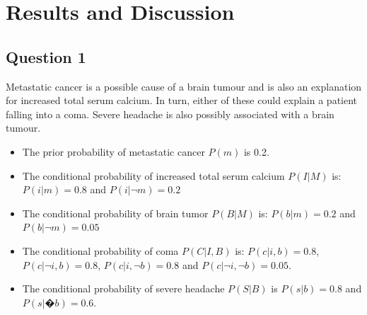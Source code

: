 \documentclass{article}
\begin{document}
\section{Results and Discussion}
\subsection{Question 1}

Metastatic cancer is a possible cause of a brain tumour and is also an explanation for increased total serum calcium. In turn, either of these could explain a patient falling into a coma. Severe headache is also possibly associated with a brain tumour. 

\begin{itemize}
\item The prior probability of metastatic cancer $P(m)$ is 0.2. 
\item The conditional probability of increased total serum calcium $P(I | M)$ is: $P(i | m) = 0.8$ and $P(i | \neg m) = 0.2$ 
\item The conditional probability of brain tumor $P(B | M)$ is: $P(b | m) = 0.2$ and $P(b | \neg m) = 0.05$ 
\item The conditional probability of coma $P(C | I, B)$ is: $P(c | i, b) = 0.8$, $P(c | \neg i, b) = 0.8$, $P(c | i, \neg b) = 0.8$ and $P(c | \neg i, \neg b) = 0.05$. 
\item The conditional probability of severe headache $P(S | B)$ is $P(s | b) = 0.8$ and $P(s | �b) = 0.6$.
\end{itemize} 
\end{document}
